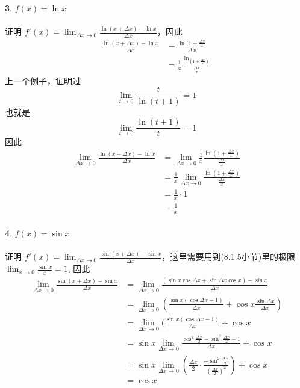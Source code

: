 \paragraph{}
\textbf{3}. $f(x) = \ln{x}$

\paragraph{}
证明\: $f'(x) = \lim_{\Delta x \to 0} \frac{\ln{(x + \Delta x)} - \ln{x}  }{\Delta x}$，因此
\begin{align*}
\frac{\ln{(x + \Delta x)} - \ln{x}  }{\Delta x} &= \frac{\ln{(1 + \frac{\Delta x}{x}}}{\Delta x} \\
& = \frac{1}{x} \frac{\ln_{(1 + \frac{\Delta x}{x} )}}{\frac{\Delta x}{x}} 
\end{align*}
上一个例子，证明过
$$
\lim_{t \to 0} \frac{t}{\ln{(t+1)}} = 1
$$
也就是
$$
\lim_{t \to 0} \frac{\ln{(t+1)}}{t} = 1
$$
因此
\begin{align*}
\lim_{\Delta x \to 0} \frac{\ln{(x + \Delta x)} - \ln{x}  }{\Delta x}  & = \lim_{\Delta x \to 0}  \frac{1}{x} \frac{\ln{(1 + \frac{\Delta x}{x} )}}{\frac{\Delta x}{x}}  \\
& = \frac{1}{x} \lim_{\Delta x \to 0}  \frac{\ln{(1 + \frac{\Delta x}{x} )}}{\frac{\Delta x}{x}} \\
&= \frac{1}{x} \cdot 1 \\
&= \frac{1}{x}
\end{align*}


\paragraph{}
\textbf{4}. $f(x) = \sin{x}$

\paragraph{}
证明\: $f'(x) = \lim_{\Delta x \to 0} \frac{\sin{(x + \Delta x)} - \sin{x}  }{\Delta x}$，这里需要用到(8.1.5小节)里的极限$\lim_{x \to 0} \frac{\sin{x}}{x} = 1$, 因此
\begin{align*}
 \lim_{\Delta x \to 0} \frac{\sin{(x + \Delta x)} - \sin{x}  }{\Delta x} & =  \lim_{\Delta x \to 0}  \frac{(\sin{x} \cos{\Delta x} + \sin{\Delta x} \cos{x}) - \sin{x} }{\Delta x} \\
 & =   \lim_{\Delta x \to 0} ( \frac{\sin{x} (\cos{\Delta x} - 1)}{\Delta x} + \cos{x}  \frac{\sin{\Delta x}}{\Delta x} ) \\
 & =  \lim_{\Delta x \to 0} ( \frac{\sin{x} (\cos{\Delta x} - 1)}{\Delta x} + \cos{x} \\
 & = \sin{x}  \lim_{\Delta x \to 0} \frac{ \cos^2{\frac{\Delta x}{2}} -  \sin^2{\frac{\Delta x}{2}} - 1}{\Delta x} + \cos{x} \\
 & =   \sin{x}  \lim_{\Delta x \to 0} (\frac{\Delta x}{2} \cdot  \frac{ - \sin^2{\frac{\Delta x}{2}}}{(\frac{\Delta x}{2})^2} ) + \cos{x} \\
 & = \cos{x} 
\end{align*}

